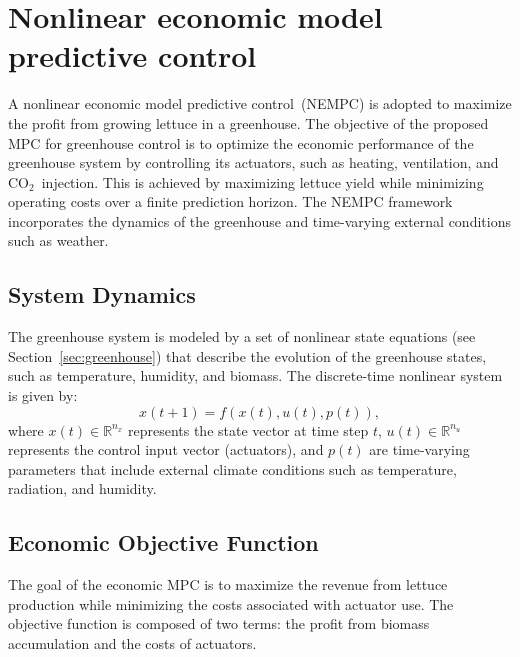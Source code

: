 \documentclass[conference]{IEEEtran}
\newcommand{\ui}[2]{#1_{\mathrm{#2}}}
\newcommand{\coo}{\ensuremath{\mathrm{CO_2}}}
\begin{document}




\section{Nonlinear economic model predictive control}\label{sec:mpc}

A nonlinear economic model predictive control~(NEMPC) is adopted to maximize the profit from growing lettuce in a greenhouse. The objective of the proposed MPC for greenhouse control is to optimize the economic performance of the greenhouse system by controlling its actuators, such as heating, ventilation, and \coo\ injection. This is achieved by maximizing lettuce yield while minimizing operating costs over a finite prediction horizon. The NEMPC framework incorporates the dynamics of the greenhouse and time-varying external conditions such as weather.

\subsection{System Dynamics}\label{subsec:mpc_dynamics}

The greenhouse system is modeled by a set of nonlinear state equations (see Section~\ref{sec:greenhouse}) that describe the evolution of the greenhouse states, such as temperature, humidity, and biomass. The discrete-time nonlinear system is given by:
\begin{equation}
    x(t+1) = f\left( x(t), u(t), p(t) \right),
\end{equation}
where \(x(t) \in \mathbb{R}^{n_x}\) represents the state vector at time step \(t\), \(u(t) \in \mathbb{R}^{n_u}\) represents the control input vector (actuators), and \(p(t)\) are time-varying parameters that include external climate conditions such as temperature, radiation, and humidity.

\subsection{Economic Objective Function}\label{subsec:mpc_objective}

The goal of the economic MPC is to maximize the revenue from lettuce production while minimizing the costs associated with actuator use. The objective function is composed of two terms: the profit from biomass accumulation and the costs of actuators.
\end{document}
